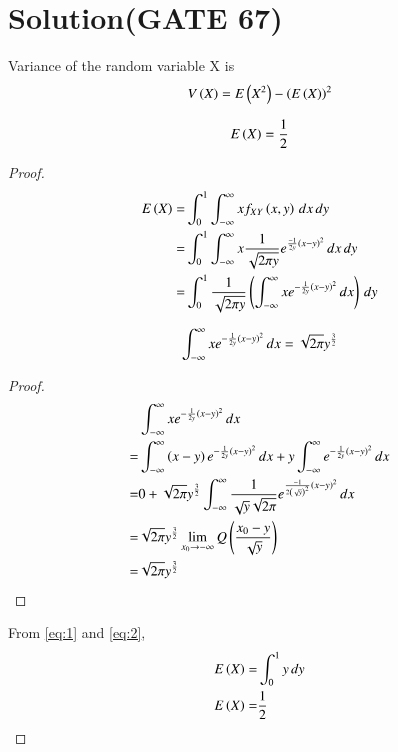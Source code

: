 \documentclass[journal,12pt,twocolumn]{IEEEtran}
\begin{document}
\section*{\textbf{Solution(GATE 67)}}
Variance of the random variable X is
\begin{align}
 V\left(X\right) = E\left(X^2\right)-\left(E\left(X\right)\right)^2   
\end{align}
\begin{lemma}
\begin{align}
E\left(X\right) = \frac{1}{2}
\end{align}
\end{lemma}
\begin{proof}
\begin{align}
 E\left(X\right)=&\int_{0}^{1}\int_{-\infty}^{\infty}x f_{XY}\left(x,y\right)\,dx\,dy\\
    =&\int_{0}^{1}\int_{-\infty}^{\infty}x\frac{1}{\sqrt{2\pi y}}e^{\frac{-1}{2y}\left(x-y\right)^2}\,dx \,dy\\
     =&\int_{0}^{1}\frac{1}{\sqrt{2\pi y}}\left(\int_{-\infty}^{\infty}xe^{-\frac{1}{2y}\left(x-y\right)^2}\,dx\right)\,dy \label{eq:1}
\end{align}
\begin{lemma}
\begin{align}
    \int_{-\infty}^{\infty}xe^{-\frac{1}{2y}\left(x-y\right)^2}\,dx = \sqrt{2\pi}y^\frac{3}{2}
\end{align}
\end{lemma}
\begin{proof}
\begin{align}
    &\int_{-\infty}^{\infty}xe^{-\frac{1}{2y}\left(x-y\right)^2}\,dx\\
  =&\int_{-\infty}^{\infty}\left(x-y\right)e^{-\frac{1}{2y}\left(x-y\right)^2}\,dx+y\int_{-\infty}^{\infty}e^{-\frac{1}{2y}\left(x-y\right)^2}\,dx\\
 =&0+\sqrt{2\pi}y^{\frac{3}{2}}\int_{-\infty}^{\infty}\frac{1}{\sqrt{y}\sqrt{2\pi}}e^{\frac{-1}{2\left(\sqrt{y}\right)^2}\left(x-y\right)^2}\,dx\\
 =&\sqrt{2\pi}y^\frac{3}{2}\lim_{x_0 \to -\infty}Q\left(\frac{x_0 - y}{\sqrt{y}}\right)\\
  =&\sqrt{2\pi}y^\frac{3}{2} \label{eq:2}
\end{align}
\end{proof}

From \eqref{eq:1} and \eqref{eq:2}, 
\begin{align}
E\left(X\right)=&\int_{0}^{1}y\,dy\\
E\left(X\right)=&\frac{1}{2} \label{eq:3}
\end{align}
\end{proof}
\end{document}

